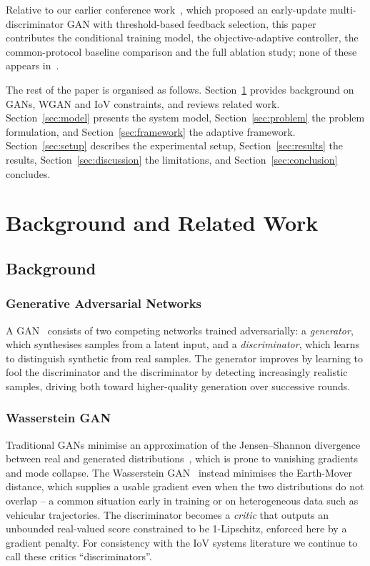 \documentclass[journal]{IEEEtran}
\begin{document}
Relative to our earlier conference work~\cite{kaleibar2025mascots}, which
proposed an early-update multi-discriminator GAN with threshold-based feedback
selection, this paper contributes the conditional training model, the
objective-adaptive controller, the common-protocol baseline comparison and the
full ablation study; none of these appears in~\cite{kaleibar2025mascots}.

The rest of the paper is organised as follows. Section~\ref{sec:related}
provides background on GANs, WGAN and IoV constraints, and reviews related
work. Section~\ref{sec:model} presents the system model, Section~\ref{sec:problem}
the problem formulation, and Section~\ref{sec:framework} the adaptive framework.
Section~\ref{sec:setup} describes the experimental setup,
Section~\ref{sec:results} the results, Section~\ref{sec:discussion} the
limitations, and Section~\ref{sec:conclusion} concludes.

\section{Background and Related Work}
\label{sec:related}

\subsection{Background}
\subsubsection{Generative Adversarial Networks}
A GAN~\cite{creswell2018gan} consists of two competing networks trained
adversarially: a \emph{generator}, which synthesises samples from a latent
input, and a \emph{discriminator}, which learns to distinguish synthetic from
real samples. The generator improves by learning to fool the discriminator and
the discriminator by detecting increasingly realistic samples, driving both
toward higher-quality generation over successive rounds.

\subsubsection{Wasserstein GAN}
Traditional GANs minimise an approximation of the Jensen--Shannon divergence
between real and generated distributions~\cite{creswell2018gan}, which is prone
to vanishing gradients and mode collapse. The Wasserstein GAN~\cite{arjovsky2017wgan}
instead minimises the Earth-Mover distance, which supplies a usable gradient
even when the two distributions do not overlap -- a common situation early in
training or on heterogeneous data such as vehicular trajectories. The
discriminator becomes a \emph{critic} that outputs an unbounded real-valued
score constrained to be 1-Lipschitz, enforced here by a gradient penalty. For
consistency with the IoV systems literature we continue to call these critics
``discriminators''.
\end{document}
